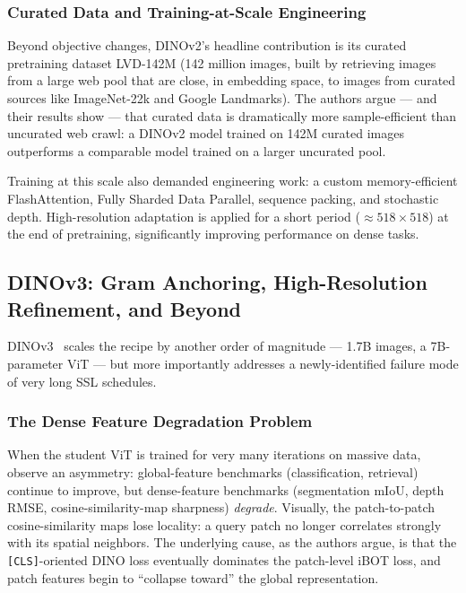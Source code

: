 \documentclass[11pt,a4paper]{article}
\begin{document}
\subsubsection{Curated Data and Training-at-Scale Engineering}

Beyond objective changes, DINOv2's headline contribution is its curated
pretraining dataset LVD-142M (142 million images, built by retrieving
images from a large web pool that are close, in embedding space, to
images from curated sources like ImageNet-22k and Google Landmarks).
The authors argue --- and their results show --- that curated data is
dramatically more sample-efficient than uncurated web crawl: a DINOv2
model trained on 142M curated images outperforms a comparable model
trained on a larger uncurated pool.

Training at this scale also demanded engineering work: a custom
memory-efficient FlashAttention, Fully Sharded Data Parallel, sequence
packing, and stochastic depth. High-resolution adaptation is applied
for a short period ($\approx 518\times 518$) at the end of pretraining,
significantly improving performance on dense tasks.

\subsection{DINOv3: Gram Anchoring, High-Resolution Refinement, and Beyond}
\label{sec:dinov3}

DINOv3~\citep{simeoni2025dinov3} scales the recipe by another order of
magnitude --- 1.7B images, a 7B-parameter ViT --- but more importantly
addresses a newly-identified failure mode of very long SSL schedules.

\subsubsection{The Dense Feature Degradation Problem}

When the student ViT is trained for very many iterations on massive data,
\citet{simeoni2025dinov3} observe an asymmetry: global-feature benchmarks
(classification, retrieval) continue to improve, but dense-feature
benchmarks (segmentation mIoU, depth RMSE, cosine-similarity-map sharpness)
\emph{degrade}. Visually, the patch-to-patch cosine-similarity maps lose
locality: a query patch no longer correlates strongly with its spatial
neighbors. The underlying cause, as the authors argue, is that the
\texttt{[CLS]}-oriented DINO loss eventually dominates the patch-level
iBOT loss, and patch features begin to ``collapse toward'' the global
representation.
\end{document}
